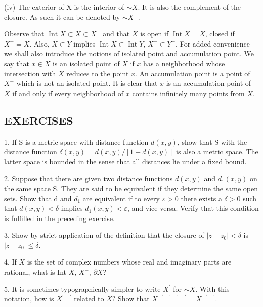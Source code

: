 (iv) The exterior of X is the interior of $\sim X$. It is also the complement of the closure. As such it can be denoted by $\sim X^{-}$.

Observe that $\operatorname{Int} X \subset X \subset X^{-}$ and that $X$ is open if $\operatorname{Int} X = X$, closed if $X^{-} = X$. Also, $X \subset Y$ implies $\operatorname{Int} X \subset \operatorname{Int} Y$, $X^{-} \subset Y^{-}$. For added convenience we shall also introduce the notions of isolated point and accumulation point. We say that $x \in X$ is an isolated point of $X$ if $x$ has a neighborhood whose intersection with $X$ reduces to the point $x$. An accumulation point is a point of $X^{-}$ which is not an isolated point. It is clear that $x$ is an accumulation point of $X$ if and only if every neighborhood of $x$ contains infinitely many points from $X$.

\subsection*{EXERCISES}
1. If S is a metric space with distance function $d(x,y)$, show that S with the distance function $\delta(x,y)=d(x,y)/[1+d(x,y)]$ is also a metric space. The latter space is bounded in the sense that all distances lie under a fixed bound.

2. Suppose that there are given two distance functions $d(x,y)$ and $d_{1}(x,y)$ on the same space S. They are said to be equivalent if they determine the same open sets. Show that d and $d_{1}$ are equivalent if to every $\varepsilon > 0$ there exists a $\delta > 0$ such that $d(x,y) < \delta$ implies $d_{1}(x,y) < \varepsilon$, and vice versa. Verify that this condition is fulfilled in the preceding exercise.

3. Show by strict application of the definition that the closure of $|z - z_0| < \delta$ is $|z - z_0| \leq \delta$.

4. If $X$ is the set of complex numbers whose real and imaginary parts are rational, what is Int $X$, $X^{-}$, $\partial X$?

5. It is sometimes typographically simpler to write $X^{\prime}$ for $\sim X$. With this notation, how is $X^{\prime-\prime}$ related to $X$? Show that $X^{-\prime-\prime-\prime-\prime} = X^{-\prime-\prime}$.

